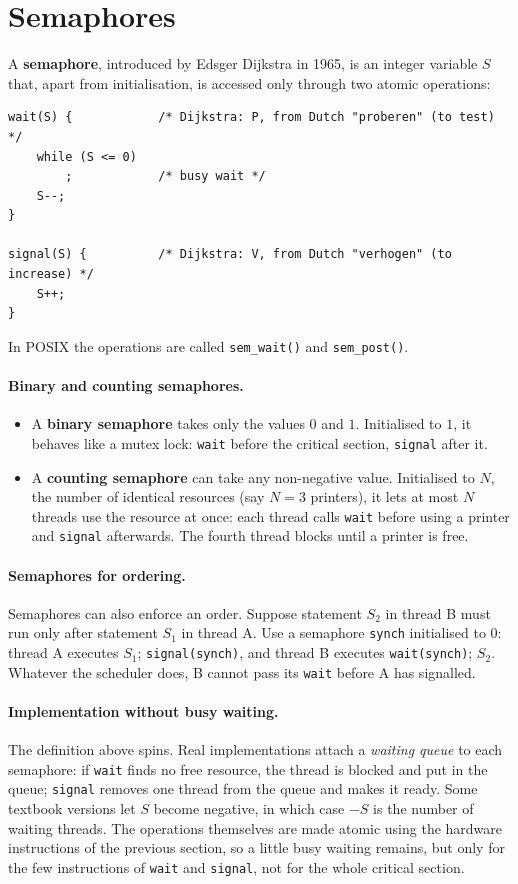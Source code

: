 \documentclass[11pt,a4paper]{article}
\newcommand{\term}[1]{\textbf{\color{mintdeep}#1}}
\newcommand{\cmd}[1]{\texttt{#1}}
\begin{document}
\section{Semaphores}

A \term{semaphore}, introduced by Edsger Dijkstra in 1965, is an integer variable $S$ that, apart from initialisation, is accessed only through two atomic operations:
\begin{lstlisting}
wait(S) {            /* Dijkstra: P, from Dutch "proberen" (to test) */
    while (S <= 0)
        ;            /* busy wait */
    S--;
}

signal(S) {          /* Dijkstra: V, from Dutch "verhogen" (to increase) */
    S++;
}
\end{lstlisting}
In POSIX the operations are called \cmd{sem\_wait()} and \cmd{sem\_post()}.

\paragraph{Binary and counting semaphores.}
\begin{itemize}
  \item A \textbf{binary semaphore} takes only the values $0$ and $1$. Initialised to $1$, it behaves like a mutex lock: \texttt{wait} before the critical section, \texttt{signal} after it.
  \item A \textbf{counting semaphore} can take any non-negative value. Initialised to $N$, the number of identical resources (say $N=3$ printers), it lets at most $N$ threads use the resource at once: each thread calls \texttt{wait} before using a printer and \texttt{signal} afterwards. The fourth thread blocks until a printer is free.
\end{itemize}

\paragraph{Semaphores for ordering.} Semaphores can also enforce an order. Suppose statement $S_2$ in thread B must run only after statement $S_1$ in thread A. Use a semaphore \texttt{synch} initialised to $0$: thread A executes $S_1$; \texttt{signal(synch)}, and thread B executes \texttt{wait(synch)}; $S_2$. Whatever the scheduler does, B cannot pass its \texttt{wait} before A has signalled.

\paragraph{Implementation without busy waiting.} The definition above spins. Real implementations attach a \emph{waiting queue} to each semaphore: if \texttt{wait} finds no free resource, the thread is blocked and put in the queue; \texttt{signal} removes one thread from the queue and makes it ready. Some textbook versions let $S$ become negative, in which case $-S$ is the number of waiting threads. The operations themselves are made atomic using the hardware instructions of the previous section, so a little busy waiting remains, but only for the few instructions of \texttt{wait} and \texttt{signal}, not for the whole critical section.
\end{document}
